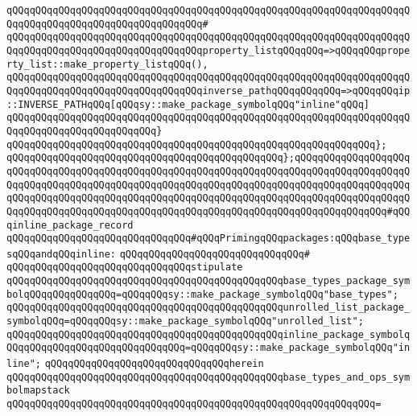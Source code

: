 \verb|qQQqqQQqqQQqqQQqqQQqqQQqqQQqqQQqqQQqqQQqqQQqqQQqqQQqqQQqqQQqqQQqqQQqqQQqqQQqqQQqqQQqqQQqqQQqqQQqqQQqqQQq#|\newline
\verb|qQQqqQQqqQQqqQQqqQQqqQQqqQQqqQQqqQQqqQQqqQQqqQQqqQQqqQQqqQQqqQQqqQQqqQQqqQQqqQQqqQQqqQQqqQQqqQQqqQQqqQQqproperty_listqQQqqQQq=>qQQqqQQqproperty_list::make_property_listqQQq(),|\newline
\verb|qQQqqQQqqQQqqQQqqQQqqQQqqQQqqQQqqQQqqQQqqQQqqQQqqQQqqQQqqQQqqQQqqQQqqQQqqQQqqQQqqQQqqQQqqQQqqQQqqQQqqQQqinverse_pathqQQqqQQqqQQq=>qQQqqQQqip::INVERSE_PATHqQQq[qQQqsy::make_package_symbolqQQq"inline"qQQq]|\newline
\verb|qQQqqQQqqQQqqQQqqQQqqQQqqQQqqQQqqQQqqQQqqQQqqQQqqQQqqQQqqQQqqQQqqQQqqQQqqQQqqQQqqQQqqQQqqQQqqQQq}|\newline
\verb|qQQqqQQqqQQqqQQqqQQqqQQqqQQqqQQqqQQqqQQqqQQqqQQqqQQqqQQqqQQqqQQq};|\newline
\verb|qQQqqQQqqQQqqQQqqQQqqQQqqQQqqQQqqQQqqQQqqQQqqQQq};qQQqqQQqqQQqqQQqqQQqqQQqqQQqqQQqqQQqqQQqqQQqqQQqqQQqqQQqqQQqqQQqqQQqqQQqqQQqqQQqqQQqqQQqqQQqqQQqqQQqqQQqqQQqqQQqqQQqqQQqqQQqqQQqqQQqqQQqqQQqqQQqqQQqqQQqqQQqqQQqqQQqqQQqqQQqqQQqqQQqqQQqqQQqqQQqqQQqqQQqqQQqqQQqqQQqqQQqqQQqqQQqqQQqqQQqqQQqqQQqqQQqqQQqqQQqqQQqqQQqqQQqqQQqqQQqqQQqqQQqqQQqqQQqqQQqqQQq#qQQqinline_package_record|\newline
\newline
\verb|qQQqqQQqqQQqqQQqqQQqqQQqqQQqqQQq#qQQqPrimingqQQqpackages:qQQqbase_typesqQQqandqQQqinline:|\newline
\verb|qQQqqQQqqQQqqQQqqQQqqQQqqQQqqQQq#|\newline
\verb|qQQqqQQqqQQqqQQqqQQqqQQqqQQqqQQqstipulate|\newline
\verb|qQQqqQQqqQQqqQQqqQQqqQQqqQQqqQQqqQQqqQQqqQQqqQQqbase_types_package_symbolqQQqqQQqqQQqqQQq=qQQqqQQqsy::make_package_symbolqQQq"base_types";|\newline
\verb|qQQqqQQqqQQqqQQqqQQqqQQqqQQqqQQqqQQqqQQqqQQqqQQqunrolled_list_package_symbolqQQq=qQQqqQQqsy::make_package_symbolqQQq"unrolled_list";|\newline
\verb|qQQqqQQqqQQqqQQqqQQqqQQqqQQqqQQqqQQqqQQqqQQqqQQqinline_package_symbolqQQqqQQqqQQqqQQqqQQqqQQqqQQqqQQq=qQQqqQQqsy::make_package_symbolqQQq"inline";|\newline
\verb|qQQqqQQqqQQqqQQqqQQqqQQqqQQqqQQqherein|\newline
\newline
\verb|qQQqqQQqqQQqqQQqqQQqqQQqqQQqqQQqqQQqqQQqqQQqqQQqbase_types_and_ops_symbolmapstack|\newline
\verb|qQQqqQQqqQQqqQQqqQQqqQQqqQQqqQQqqQQqqQQqqQQqqQQqqQQqqQQqqQQqqQQq=|\newline

